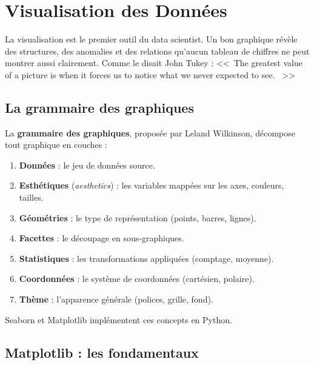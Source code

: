 \chapter{Visualisation des Donn\'ees}
\label{ch:visualisation}

\begin{intuition}
La visualisation est le premier outil du data scientist. Un bon graphique r\'ev\`ele des structures, des anomalies et des relations qu'aucun tableau de chiffres ne peut montrer aussi clairement. Comme le disait John Tukey : <<~The greatest value of a picture is when it forces us to notice what we never expected to see. ~>>
\end{intuition}

\section{La grammaire des graphiques}

La \textbf{grammaire des graphiques}, propos\'ee par Leland Wilkinson, d\'ecompose tout graphique en couches :
\begin{enumerate}
    \item \textbf{Donn\'ees} : le jeu de donn\'ees source.
    \item \textbf{Esth\'etiques} (\emph{aesthetics}) : les variables mapp\'ees sur les axes, couleurs, tailles.
    \item \textbf{G\'eom\'etries} : le type de repr\'esentation (points, barres, lignes).
    \item \textbf{Facettes} : le d\'ecoupage en sous-graphiques.
    \item \textbf{Statistiques} : les transformations appliqu\'ees (comptage, moyenne).
    \item \textbf{Coordonn\'ees} : le syst\`eme de coordonn\'ees (cart\'esien, polaire).
    \item \textbf{Th\`eme} : l'apparence g\'en\'erale (polices, grille, fond).
\end{enumerate}

Seaborn et Matplotlib impl\'ementent ces concepts en Python.

\section{Matplotlib : les fondamentaux}

